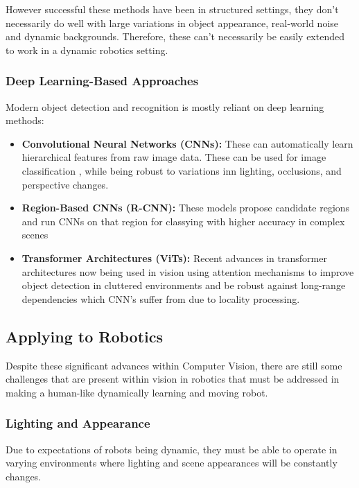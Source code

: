     However successful these methods have been in structured settings, they don't necessarily do well with large variations in object appearance, real-world noise and dynamic backgrounds. Therefore, these can't necessarily be easily extended to work in a dynamic robotics setting.

    \subsubsection{Deep Learning-Based Approaches}
    Modern object detection and recognition is mostly reliant on deep learning methods:
    \begin{itemize}
      \item \textbf{Convolutional Neural Networks (CNNs):} These \cite{gu2018recent,li2021survey} can automatically learn hierarchical features from raw image data. These can be used for image classification \cite{hijazi2015using,traore2018deep}, while being robust to variations inn lighting, occlusions, and perspective changes.
      \item \textbf{Region-Based CNNs (R-CNN):} These models propose candidate regions and run CNNs on that region for classying with higher accuracy in complex scenes \cite{bharati2020deep, girshick2015fastrcnn}
      \item \textbf{Transformer Architectures (ViTs):} Recent advances in transformer architectures \cite{bi2021transformer} now being used in vision using attention mechanisms to improve object detection in cluttered environments \cite{kayacan2024vision} and be robust against long-range dependencies which CNN's suffer from due to locality processing.
    \end{itemize}

  \subsection{Applying to Robotics}
    Despite these significant advances within Computer Vision, there are still some challenges that are present within vision in robotics that must be addressed in making a human-like dynamically learning and moving robot.

    \subsubsection{Lighting and Appearance}
      Due to expectations of robots being dynamic, they must be able to operate in varying environments where lighting and scene appearances will be constantly changes.

